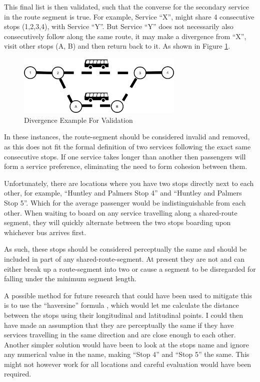\documentclass{article}
\begin{document}
\par
This final list is then validated, such that the converse for the secondary service in the route segment is true. For example, Service ``X'', might share 4 consecutive stops (1,2,3,4), with Service ``Y''. But Service ``Y'' does not necessarily also consecutively follow along the same route, it may make a divergence from ``X'', visit other stops (A, B) and then return back to it. As shown in Figure \ref{fig:divergance}.

\begin{figure}[H]
	\centering
	\includegraphics[width=300px]{images/divergance.png}
	\caption{Divergence Example For Validation}
	\label{fig:divergance}
\end{figure}


\par
In these instances, the route-segment should be considered invalid and removed, as this does not fit the formal definition of two services following the exact same consecutive stops. If one service takes longer than another then passengers will form a service preference, eliminating the need to form cohesion between them. 


\par
Unfortunately, there are locations where you have two stops directly next to each other, for example, ``Huntley and Palmers Stop 4'' and ``Huntley and Palmers Stop 5''. Which for the average passenger would be indistinguishable from each other. When waiting to board on any service travelling along a shared-route segment, they will quickly alternate between the two stops boarding upon whichever bus arrives first. 

\par 
As such, these stops should be considered perceptually the same and should be included in part of any shared-route-segment. At present they are not and can either break up a route-segment into two or cause a segment to be disregarded for falling under the minimum segment length. 

\par 
A possible method for future research that could have been used to mitigate this is to use the ``haversine'' formula \cite{RN43}, which would let me calculate the distance between the stops using their longitudinal and latitudinal points. I could then have made an assumption that they are perceptually the same if they have services travelling in the same direction and are close enough to each other. Another simpler solution would have been to look at the stops name and ignore any numerical value in the name, making ``Stop 4'' and ``Stop 5'' the same. This might not however work for all locations and careful evaluation would have been required.  
\end{document}
